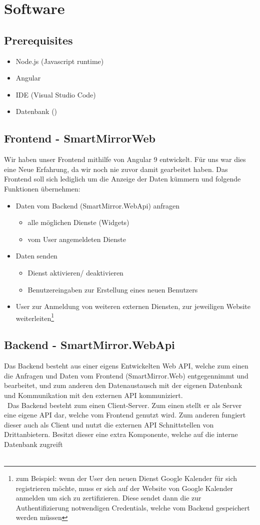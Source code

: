 \section{Software}
\subsection{Prerequisites}
\begin{itemize}
\item Node.js (Javascript runtime)
\item Angular
\item IDE (Visual Studio Code)
\item Datenbank ()
\end{itemize}

\subsection{Frontend - SmartMirrorWeb}
Wir haben unser Frontend mithilfe von Angular 9 entwickelt. Für uns war dies eine Neue Erfahrung, da wir noch nie zuvor damit gearbeitet haben. Das Frontend soll sich lediglich um die Anzeige der Daten kümmern und folgende Funktionen übernehmen:
\begin{itemize}
\item Daten vom Backend (SmartMirror.WebApi) anfragen
\begin{itemize}
\item alle möglichen Dienste (Widgets)
\item vom User angemeldeten Dienste
\end{itemize}
\item Daten senden
\begin{itemize}
\item Dienst aktivieren/ deaktivieren
\item Benutzereingaben zur Erstellung eines neuen Benutzers
\end{itemize}
\item User zur Anmeldung von weiteren externen Diensten, zur jeweiligen Website weiterleiten\footnote{zum Beispiel: wenn der User den neuen Dienst Google Kalender für sich registrieren möchte, muss er sich auf der Website von Google Kalender anmelden um sich zu zertifizieren. Diese sendet dann die zur Authentifizierung notwendigen Credentials, welche vom Backend gespeichert werden müssen }
\end{itemize} 
\subsection{Backend - SmartMirror.WebApi}
Das Backend besteht aus einer eigens Entwickelten Web API, welche zum einen die Anfragen und Daten vom Frontend (SmartMirror.Web) entgegennimmt und bearbeitet, und zum anderen den Datenaustausch mit der eigenen Datenbank und Kommunikation mit den externen API kommuniziert.\\\
Das Backend besteht zum einen Client-Server. Zum einen stellt er als Server eine eigene API dar, welche vom Frontend genutzt wird. Zum anderen fungiert dieser auch als Client und nutzt die externen API Schnittstellen von Drittanbietern. Besitzt dieser eine extra Komponente, welche auf die interne Datenbank zugreift\\\
